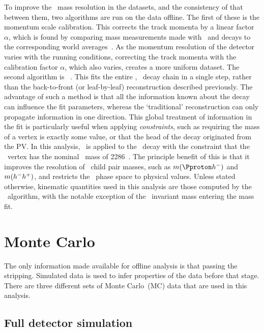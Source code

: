 To improve the \PLambdac\ mass resolution in the datasets, and the consistency 
of that between them, two algorithms are run on the data offline.
The first of these is the momentum scale calibration.
This corrects the track momenta by a linear factor $\alpha$, which is found by 
comparing mass measurements made with \JpsiTomumu\ and 
\decay{\PBplus}{\PJpsi\PKplus} decays to the corresponding world 
averages~\cite{Aaij:2014jba}.
As the momentum resolution of the detector varies with the running conditions, 
correcting the track momenta with the calibration factor $\alpha$, which also 
varies, creates a more uniform dataset.
The second algorithm is \decaytreefitter~\cite{Hulsbergen:2005pu}.
This fits the entire \LbToLcmuX, \LcTophh\ decay chain in a single step, rather 
than the back-to-front (or leaf-by-leaf) reconstruction described previously.
The advantage of such a method is that all the information known about the 
decay can influence the fit parameters, whereas the `traditional' 
reconstruction can only propagate information in one direction.
This global treatment of information in the fit is particularly useful when 
applying \emph{constraints}, such as requiring the mass of a vertex is exactly 
some value, or that the head of the decay originated from the \ac{PV}.
In this analysis, \decaytreefitter\ is applied to the \PLambdab\ decay with the 
constraint that the \phh\ vertex has the nominal \PLambdac\ mass of 
\SI{2286}{\MeVcc}~\cite{PDG2014}.
The principle benefit of this is that it improves the resolution of \PLambdac\ 
child pair masses, such as $m(\phm)$ and $m(h^{-}h^{+})$, and restricts the 
\PLambdac\ phase space to physical values.
Unless stated otherwise, kinematic quantities used in this analysis are those 
computed by the \decaytreefitter\ algorithm, with the notable exception of the 
\phh\ invariant mass entering the mass fit.

\section{Monte Carlo}
\label{chap:cpv:data:mc}

The only information made available for offline analysis is that passing the 
stripping.
Simulated data is used to infer properties of the data before that stage.
There are three different sets of Monte Carlo~(MC) data that are used in this 
analysis.

\subsection{Full detector simulation}
\label{chap:cpv:data:mc:full}

